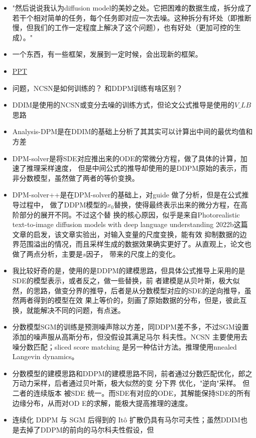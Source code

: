 \begin{itemize}
  \item "然后说说我认为diffusion model的美妙之处。它把困难的数据生成，拆分成了若干个相对简单的任务，每个任务即对应一次去噪。这种拆分有坏处（即推断慢，但我们的工作一定程度上解决了这个问题），也有好处（更加可控的生成）。"

  \item 一个东西，有一些框架，发展到一定时候，会出现新的框架。
  \item \href{https://ml.cs.tsinghua.edu.cn/~fanbao/Application-DPM.pdf}{PPT}
  \item 问题，NCSN是如何训练的？ 和DDPM训练有啥区别？
  \item DDIM是使用的NCSN或变分去噪的训练方式，但论文公式推导是使用的$V\_LB$思路
  \item Analysis-DPM是在DDIM的基础上分析了其其实可以计算出中间的最优均值和方差
  \item DPM-solver是将SDE对应推出来的ODE的常微分方程，做了具体的计算，加速了推理采样速度，
  但是中间公式的推导却使用的是DDPM原始的表示，而非分数模型，虽然做了两者的等价变换。
  \item DPM-solver++是在DPM-solver的基础上，对guide 做了分析，但是在公式推导过程中，
  做了DDPM模型的$x_0$替换，使得最终表示出来的微分方程，在高阶部分的展开不同。不过这个替
  换的核心原因，似乎是来自Photorealistic text-to-image diffusion models with deep 
  language understanding 2022b这篇文章的启发，该文章实验出，对输入变量的尺度变换，能有效
  抑制数据的边界范围溢出的情况，而且采样生成的数据效果确实更好了。从直观上，论文也做了两点分析，主要是$s$因子，
  带来的尺度上的变化。
  \item 我比较好奇的是，使用的是DDPM的建模思路，但具体公式推导上采用的是SDE的模型表示，或者反之，做一些替换，前
  者建模是从贝叶斯，极大似然，的思路，做变分界的推导，后者是从分数模型对应的SDE的逆向推导，虽然两者得到的模型在效
  果上等价的，刻画了原始数据的分布，但是，彼此互换，就能解决不同的问题，有点迷。
  \item 分数模型SGM的训练是预测噪声除以方差，同DDPM差不多，不过SGM设置添加的噪声服从高斯分布，但没假设其满足马尔
  科夫性。NCSN 主要使用去噪分数匹配；sliced score matching 是另一种估计方法。推理使用nnealed Langevin dynamics。
  \item 分数模型的建模思路和DDPM的建模思路不同，前者通过分数匹配优化，郎之万动力采样，后者通过贝叶斯，极大似然的变
  分下界 优化，"逆向"采样。 但二者的连续版本 被SDE 统一。而SDE有对应的ODE，其解能保持SDE的所有边缘分布，从而对OD
  E的求解，能极大提高推理的速度。
  \item 连续化 DDPM 与 SGM 后得到的 Itô 扩散仍具有马尔可夫性；虽然DDIM也是去掉了DDPM的前向的马尔科夫性假设，但

\end{itemize}
